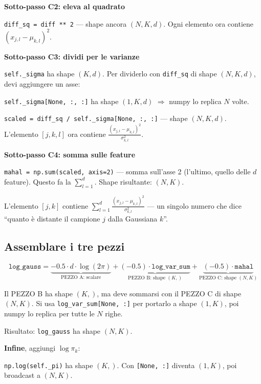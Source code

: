 \documentclass[11pt,a4paper]{article}
\begin{document}
\bigskip
\textbf{Sotto-passo C2: eleva al quadrato}

\texttt{diff\_sq = diff ** 2} --- shape ancora $(N, K, d)$. Ogni elemento ora contiene $(x_{j,l} - \mu_{k,l})^2$.

\bigskip
\textbf{Sotto-passo C3: dividi per le varianze}

\texttt{self.\_sigma} ha shape $(K, d)$. Per dividerlo con \texttt{diff\_sq} di shape $(N, K, d)$, devi aggiungere un asse:

\texttt{self.\_sigma[None, :, :]} ha shape $(1, K, d)$ $\Rightarrow$ numpy lo replica $N$ volte.

\texttt{scaled = diff\_sq / self.\_sigma[None, :, :]} --- shape $(N, K, d)$. L'elemento $[j,k,l]$ ora contiene $\frac{(x_{j,l} - \mu_{k,l})^2}{\sigma_{k,l}^2}$.

\bigskip
\textbf{Sotto-passo C4: somma sulle feature}

\texttt{mahal = np.sum(scaled, axis=2)} --- somma sull'asse 2 (l'ultimo, quello delle $d$ feature). Questo fa la $\sum_{l=1}^d$. Shape risultante: $(N, K)$.

L'elemento $[j, k]$ contiene $\sum_{l=1}^{d}\frac{(x_{j,l} - \mu_{k,l})^2}{\sigma_{k,l}^2}$ --- un singolo numero che dice ``quanto \`e distante il campione $j$ dalla Gaussiana $k$''.

\subsection{Assemblare i tre pezzi}

$$\texttt{log\_gauss} = \underbrace{-0.5 \cdot d \cdot \log(2\pi)}_{\text{PEZZO A: scalare}} + \underbrace{(-0.5) \cdot \texttt{log\_var\_sum}}_{\text{PEZZO B: shape $(K,)$}} + \underbrace{(-0.5) \cdot \texttt{mahal}}_{\text{PEZZO C: shape $(N, K)$}}$$

Il PEZZO B ha shape $(K,)$, ma deve sommarsi con il PEZZO C di shape $(N, K)$. Si usa \texttt{log\_var\_sum[None, :]} per portarlo a shape $(1, K)$, poi numpy lo replica per tutte le $N$ righe.

Risultato: \texttt{log\_gauss} ha shape $(N, K)$.

\medskip
\textbf{Infine}, aggiungi $\log\pi_k$:

\texttt{np.log(self.\_pi)} ha shape $(K,)$. Con \texttt{[None, :]} diventa $(1, K)$, poi broadcast a $(N, K)$.
\end{document}
